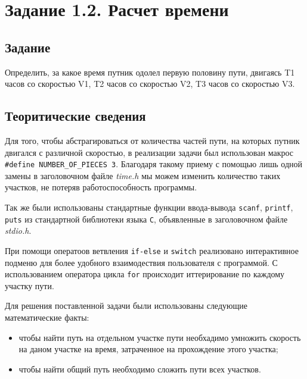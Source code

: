 \documentclass[12pt,a4paper]{report}
\begin{document}
\newpage




\section{Задание 1.2. Расчет времени}
\subsection{Задание}
\hspace{\parindent}Определить, за какое время путник одолел первую половину пути, двигаясь T1 часов со скоростью V1, T2 часов со скоростью V2, T3 часов со скоростью V3.

\subsection{Теоритические сведения}
\hspace{\parindent}Для того, чтобы абстрагироваться от количества частей пути, на которых путник двигался с различной скоростью, в реализации задачи был использован макрос \verb+#define NUMBER_OF_PIECES 3+. Благодаря такому приему с помощью лишь одной замены в заголовочном файле \textit{time.h} мы можем изменить количество таких участков, не потеряв работоспособность программы.

Так же были использованы стандартные функции ввода-вывода \texttt{scanf}, \texttt{printf}, \texttt{puts} из стандартной библиотеки языка \verb+С+, объявленные в заголовочном файле \textit{stdio.h}.

При помощи оператоов ветвления \texttt{if-else} и \texttt{switch} реализовано интерактивное подменю для более удобного взаимодествия пользователя с программой. С использованием оператора цикла \texttt{for} происходит иттерирование по каждому участку пути.

Для решения поставленной задачи были использованы следующие математические факты: 
\begin{itemize}
\item чтобы найти путь на отдельном участке пути необхадимо умножить скорость на даном участке на время, затраченное на прохождение этого участка;
\item чтобы найти общий путь необходимо сложить пути всех участков.
\end{itemize}
\end{document}

